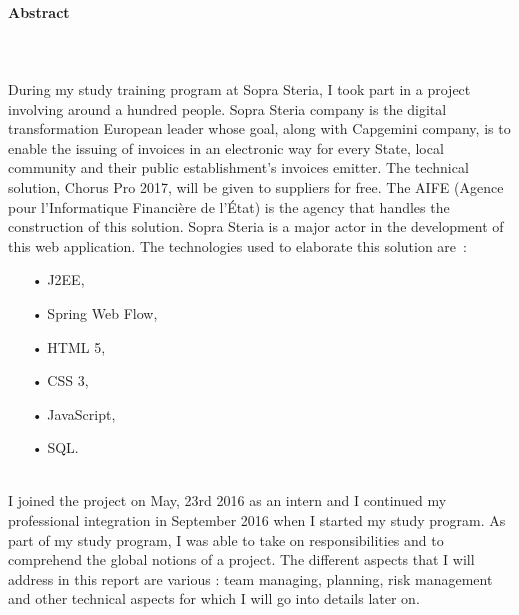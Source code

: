 \documentclass[12pt,a4paper]{article}
\begin{document}
\paragraph{Abstract}
~~\\\\
During my study training program at Sopra Steria, I took part in a project involving around a hundred people. Sopra Steria company is the digital transformation European leader whose goal, along with Capgemini company, is to enable the issuing of invoices in an electronic way for every State, local community and their public establishment’s invoices emitter. The technical solution, Chorus Pro 2017, will be given to suppliers for free. The AIFE (Agence pour l’Informatique Financière de l’État) is the agency that handles the construction of this solution. Sopra Steria is a major actor in the development of this web application. The technologies used to elaborate this solution are~:\\
\begin{itemize}
\item[•] \gls{J2EE},
\item[•] Spring Web Flow,
\item[•] HTML 5,
\item[•] CSS 3,
\item[•] JavaScript,
\item[•] \gls{SQL}.
\end{itemize}
~~\\
 I joined the project on May, 23rd 2016 as an intern and I continued my professional integration in September 2016 when I started my study program. As part of my study program, I was able to take on responsibilities and to comprehend the global notions of a project. The different aspects that I will address in this report are various : team managing, planning, risk management and other technical aspects for which I will go into details later on. 
\newpage
\renewcommand{\contentsname}{Table des matières}
\tableofcontents
\newpage
\end{document}
